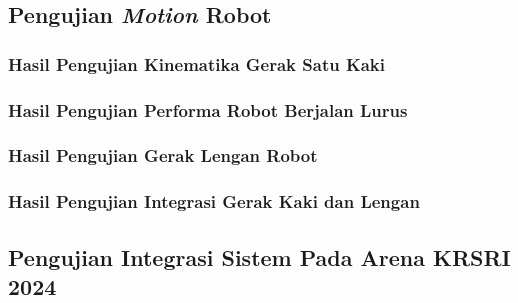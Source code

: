 \subsection{Pengujian \emph{Motion} Robot}

\subsubsection{Hasil Pengujian Kinematika Gerak Satu Kaki}

\subsubsection{Hasil Pengujian Performa Robot Berjalan Lurus}

\subsubsection{Hasil Pengujian Gerak Lengan Robot}

\subsubsection{Hasil Pengujian Integrasi Gerak Kaki dan Lengan}


\subsection{Pengujian Integrasi Sistem Pada Arena KRSRI 2024}






